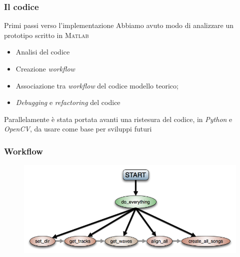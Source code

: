 \begin{frame}
\frametitle{Il codice}
\begin{block}{Primi passi verso l'implementazione}
Abbiamo avuto modo di analizzare un prototipo scritto in \textsc{Matlab}
\end{block}

\begin{block}{}
\begin{itemize}
\item Analisi del codice
\item Creazione \emph{workflow}
\item Associazione tra \emph{workflow} del codice modello teorico;
\item \textit{Debugging} e \textit{refactoring} del codice
\end{itemize}
\end{block}

\begin{block}{}
Parallelamente \`e stata portata avanti una ristesura del codice, in \emph{Python}
e \emph{OpenCV}, da usare come base per sviluppi futuri
\end{block}
\end{frame}

\begin{frame}
\frametitle{Workflow}
\begin{figure}
\includegraphics[width=\textwidth]{immagini/workflow.png}
\end{figure}
\end{frame}

